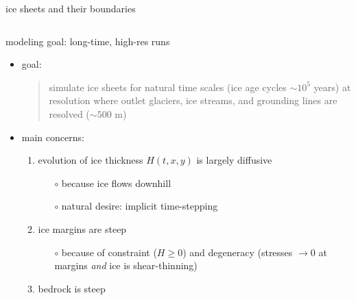 \documentclass[hide notes,intlimits,usenames,dvipsnames]{beamer}
\begin{document}
\begin{frame}{ice sheets and their boundaries}
\begin{columns}
\begin{column}{0.6\textwidth}
\end{column}
\end{columns}
\end{frame}


\begin{frame}{modeling goal: long-time, high-res runs}

\begin{itemize}
\item goal:
\begin{quote}
simulate ice sheets for natural time scales (ice age cycles \alert{$\sim 10^5$ years}) at resolution where outlet glaciers, ice streams, and grounding lines are resolved (\alert{$\sim 500$ m})
\end{quote}
\item main concerns:
    \begin{enumerate}
    \item evolution of ice thickness $H(t,x,y)$ is largely diffusive
        \begin{itemize}
        \item[$\circ$] because ice flows downhill
        \item[$\circ$] natural desire: implicit time-stepping
        \end{itemize}
    \item ice margins are steep
        \begin{itemize}
        \item[$\circ$] because of constraint ($H\ge 0$) and degeneracy (stresses $\to 0$ at margins \emph{and} ice is shear-thinning)
        \end{itemize}
    \item bedrock is steep
    \end{enumerate}
\end{itemize}
\end{frame}
\end{document}
